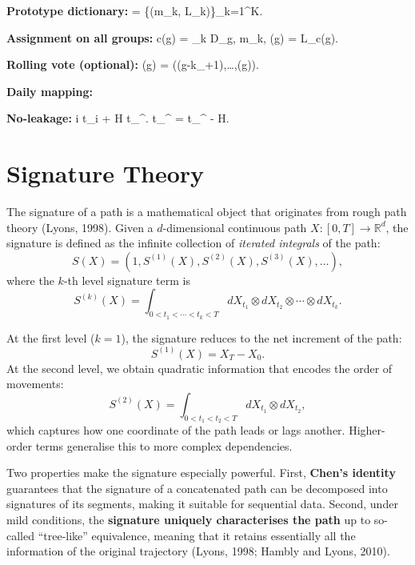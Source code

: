 \textbf{Prototype dictionary:}\quad
{} = \{(m_k, L_k)\}_{k=1}^K.

\textbf{Assignment on all groups:}\quad
c(g) = \arg\min_k D_{g, m_k}, \qquad
{}(g) = L_{c(g)}.

\textbf{Rolling vote (optional):}\quad
{}(g) = \big((g-k_{}+1),\dots,(g)\big).

\textbf{Daily mapping:}\quad
{}

\textbf{No-leakage:}\quad
{} i  t_i + H \le t_{}^{}.
 t_{}^{} = t_{}^{} - H.
\fi

\section{Signature Theory}

The signature of a path is a mathematical object that originates from rough path theory (Lyons, 1998). 
Given a $d$-dimensional continuous path $X : [0,T] \to \mathbb{R}^d$, the signature is defined as the infinite collection of \emph{iterated integrals} of the path: 
\[
S(X) = \left( 1, S^{(1)}(X), S^{(2)}(X), S^{(3)}(X), \dots \right),
\]
where the $k$-th level signature term is
\[
S^{(k)}(X) = \int_{0 < t_1 < \cdots < t_k < T} dX_{t_1} \otimes dX_{t_2} \otimes \cdots \otimes dX_{t_k}.
\]

At the first level ($k=1$), the signature reduces to the net increment of the path:
\[
S^{(1)}(X) = X_T - X_0.
\]
At the second level, we obtain quadratic information that encodes the order of movements:
\[
S^{(2)}(X) = \int_{0 < t_1 < t_2 < T} dX_{t_1} \otimes dX_{t_2},
\]
which captures how one coordinate of the path leads or lags another. Higher-order terms generalise this to more complex dependencies.

Two properties make the signature especially powerful. First, \textbf{Chen’s identity} guarantees that the signature of a concatenated path can be decomposed into signatures of its segments, making it suitable for sequential data. Second, under mild conditions, the \textbf{signature uniquely characterises the path} up to so-called ``tree-like'' equivalence, meaning that it retains essentially all the information of the original trajectory (Lyons, 1998; Hambly and Lyons, 2010). 

